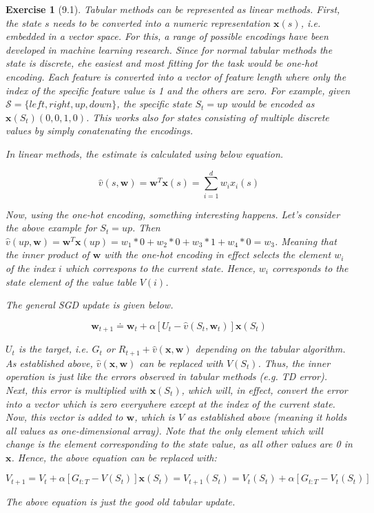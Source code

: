 \documentclass[a4paper]{scrartcl}
\theoremstyle{nonumberplain}
\newtheorem{ex}{Exercise}
\begin{document}
\begin{ex}[9.1]

Tabular methods can be represented as linear methods. First, the state $s$ needs to be converted into a numeric representation $\mathbf{x}(s)$, i.e. embedded in a vector space. For this, a range of possible encodings have been developed in machine learning research. Since for normal tabular methods the state is discrete, ehe easiest and most fitting for the task would be one-hot encoding. Each feature is converted into a vector of feature length where only the index of the specific feature value is 1 and the others are zero. For example, given $\mathcal{S}=\{left, right, up, down\}$, the specific state $S_t=up$ would be encoded as $\mathbf{x}(S_t)(0,0,1,0)$. This works also for states consisting of multiple discrete values by simply conatenating the encodings.

In linear methods, the estimate is calculated using below equation.

\begin{equation}
\hat{v}(s,\mathbf{w})=\mathbf{w}^T \mathbf{x}(s)= \sum_{i=1}^{d} w_i x_i(s)
\end{equation}

Now, using the one-hot encoding, something interesting happens. Let's consider the above example for $S_t=up
$. Then $\hat{v}(up,\mathbf{w})=\mathbf{w}^T \mathbf{x}(up)=  w_1 * 0 + w_2 * 0 + w_3 * 1 + w_4 * 0=w_3$. Meaning that the inner product of $\mathbf{w}$ with the one-hot encoding in effect \emph{selects} the element $w_i$ of the index $i$ which correspons to the current state. Hence, $w_i$ corresponds to the state element of the value table $V(i)$.


The general SGD update is given below.

\begin{equation}
\mathbf{w}_{t+1} \doteq \mathbf{w}_t + \alpha [U_t - \hat{v}(S_t,\mathbf{w}_t)] \mathbf{x}(S_t)
\end{equation}

$U_t$ is the target, i.e. $G_t$ or $R_{t+1}+\hat{v}(\mathbf{x},\mathbf{w})$ depending on the tabular algorithm. As established above, $\hat{v}(\mathbf{x},\mathbf{w})$ can be replaced with $V(S_t)$. Thus, the inner operation is just like the errors observed in tabular methods (e.g. TD error). Next, this error is multiplied with $\mathbf{x}(S_t)$, which will, in effect, convert the error into a vector which is zero everywhere except at the index of the current state. Now, this vector is added to $\mathbf{w}$, which is $V$ as established above (meaning it holds all values as one-dimensional array). Note that the only element which will change is the element corresponding to the state value, as all other values are 0 in $\mathbf{x}$. Hence, the above equation can be replaced with:

\begin{equation}
V_{t+1}=V_t + \alpha [G_{t:T} - V(S_t)]\mathbf{x}(S_t)= V_{t+1}(S_t) = V_t(S_t)  + \alpha [G_{t:T} - V_t(S_t)]
\end{equation}

The above equation is just the good old tabular update.

\end{ex}
\end{document}

